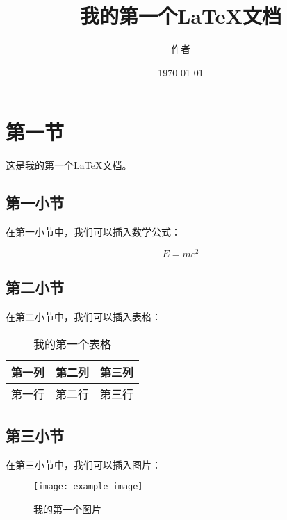 \documentclass[UTF8]{ctexart}
\title{我的第一个LaTeX文档}
\author{作者}
\date{\today}
\begin{document}
\maketitle

\section{第一节}

这是我的第一个LaTeX文档。

\subsection{第一小节}

在第一小节中，我们可以插入数学公式：

\begin{equation}
E=mc^2
\end{equation}

\subsection{第二小节}

在第二小节中，我们可以插入表格：

\begin{table}[htbp]
\centering
\begin{tabular}{|c|c|c|}
\hline
第一列 & 第二列 & 第三列 \\
\hline
第一行 & 第二行 & 第三行 \\
\hline
\end{tabular}
\caption{我的第一个表格}
\end{table}

\subsection{第三小节}

在第三小节中，我们可以插入图片：

\begin{figure}[htbp]
\centering
\texttt{[image: example-image]}
\caption{我的第一个图片}
\end{figure}



\end{document}
